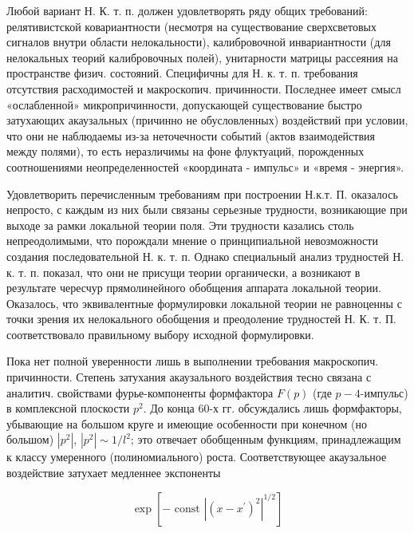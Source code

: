 \documentclass[10pt]{article}
\begin{document}
Любой вариант Н. К. т. п. должен удовлетворять ряду общих требований: релятивистской ковариантности (несмотря на существование сверхсветовых сигналов внутри области нелокальности), калибровочной инвариантности (для нелокальных теорий калибровочных полей), унитарности матрицы рассеяния на пространстве физич. состояний. Специфичны для Н. к. т. п. требования отсутствия расходимостей и макроскопич. причинности. Последнее имеет смысл «ослабленной» микропричинности, допускающей существование быстро затухающих акаузальных (причинно не обусловленных) воздействий при условии, что они не наблюдаемы из-за неточечности событий (актов взаимодействия между полями), то есть неразличимы на фоне флуктуаций, порожденных соотношениями неопределенностей «координата - импульс» и «время - энергия».



Удовлетворить перечисленным требованиям при построении Н.к.т. П. оказалось непросто, с каждым из них были связаны серьезные трудности, возникающие при выходе за рамки локальной теории поля. Эти трудности казались столь непреодолимыми, что порождали мнение о принципиальной невозможности создания последовательной Н. к. т. п. Однако специальный анализ трудностей Н. к. т. п. показал, что они не присущи теории органически, а возникают в результате чересчур прямолинейного обобщения аппарата локальной теории. Оказалось, что эквивалентные формулировки локальной теории не равноценны с точки зрения их нелокального обобщения и преодоление трудностей Н. К. т. П. соответствовало правильному выбору исходной формулировки.



Пока нет полной уверенности лишь в выполнении требования макроскопич. причинности. Степень затухания акаузального воздействия тесно связана с аналитич. свойствами фурье-компоненты формфактора $F(p)$ (где $p-4$-импульс) в комплексной плоскости $p^{2}$. До конца 60-х гг. обсуждались лишь формфакторы, убывающие на большом круге и имеющие особенности при конечном (но большом) $\left|p^{2}\right|$, $\left|p^{2}\right| \sim 1 / l^{2}$; это отвечает обобщенным функциям, принадлежащим к классу умеренного (полиномиального) роста. Соответствующее акаузальное воздействие затухает медленнее экспоненты



\[

\exp \left[- \text { const }\left|\left(x-x^{\prime}\right)^{2}\right|^{1 / 2}\right]

\]
\end{document}
